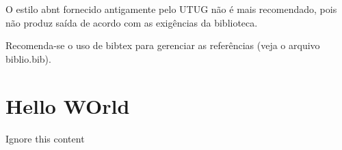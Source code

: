 \documentclass[diss,ppgc,openright,english]{iiufrgs}
\begin{document}
O estilo abnt fornecido antigamente pelo UTUG não é mais recomendado, pois não
produz saída de acordo com as exigências da biblioteca.

Recomenda-se o uso de bibtex para gerenciar as referências (veja o arquivo
biblio.bib).

%






\appendix
\chapter{Hello WOrld}

Ignore this content
\end{document}
